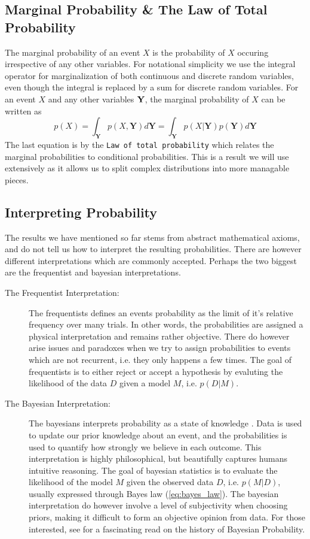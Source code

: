 \subsection{Marginal Probability \& The Law of Total Probability}
The marginal probability of an event $X$ is the probability of $X$ occuring irrespective of any other variables.
For notational simplicity we use the integral operator for marginalization of both continuous and discrete random variables, even though the integral is replaced by a sum for discrete random variables. For an event $X$ and any other variables $\bf Y$, the marginal probability of $X$ can be written as
\begin{equation}
    p(X) = \int_\mathbf{Y} p(X, \mathbf{Y}) d\mathbf{Y} = \int_\mathbf{Y} p(X | \mathbf{Y}) p(\mathbf{Y}) d\mathbf{Y}
\end{equation}
The last equation is by the \texttt{Law of total probability} which relates the marginal probabilities to conditional probabilities. This is a result we will use extensively as it allows us to split complex distributions into more managable pieces.

\subsection{Interpreting Probability}
The results we have mentioned so far stems from abstract mathematical axioms, and do not tell us how to interpret the resulting probabilities. There are however different interpretations which are commonly accepted. Perhaps the two biggest are the frequentist and bayesian interpretations. 

\begin{description}
    \item[The Frequentist Interpretation:] The frequentists defines an events probability as the limit of it's relative frequency over many trials. In other words, the probabilities are assigned a physical interpretation and remains rather objective. There do however arise issues and paradoxes when we try to assign probabilities to events which are not recurrent, i.e. they only happens a few times. The goal of frequentists is to either reject or accept a hypothesis by evaluting the likelihood of the data $D$ given a model $M$, i.e. $p(D | M)$. 
    \item[The Bayesian Interpretation:] The bayesians interprets probability as a state of knowledge \cite{Jaynes86bayesianmethods:}. Data is used to update our prior knowledge about an event, and the probabilities is used to quantify how strongly we believe in each outcome. This interpretation is highly philosophical, but beautifully captures humans intuitive reasoning. The goal of bayesian statistics is to evaluate the likelihood of the model $M$ given the observed data $D$, i.e. $p(M | D)$, usually expressed through Bayes law (\cref{eq:bayes_law}). The bayesian interpretation do however involve a level of subjectivity when choosing priors, making it difficult to form an objective opinion from data. For those interested, see \Cite{Jaynes86bayesianmethods:} for a fascinating read on the history of Bayesian Probability.
\end{description}

